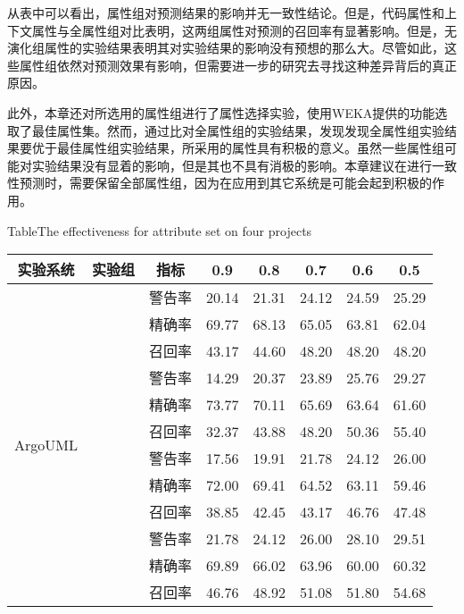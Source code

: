 从表中可以看出，属性组对预测结果的影响并无一致性结论。但是，代码属性和上下文属性与全属性组对比表明，这两组属性对预测的召回率有显著影响。但是，无演化组属性的实验结果表明其对实验结果的影响没有预想的那么大。尽管如此，这些属性组依然对预测效果有影响，但需要进一步的研究去寻找这种差异背后的真正原因。

此外，本章还对所选用的属性组进行了属性选择实验，使用WEKA提供的功能选取了最佳属性集。然而，通过比对全属性组的实验结果，发现发现全属性组实验结果要优于最佳属性组实验结果，所采用的属性具有积极的意义。虽然一些属性组可能对实验结果没有显着的影响，但是其也不具有消极的影响。本章建议在进行一致性预测时，需要保留全部属性组，因为在应用到其它系统是可能会起到积极的作用。

\begin{table} 
\renewcommand\arraystretch{0.65} 
{Table$\!$}{The effectiveness for attribute set on four projects}
\vspace{0.5em}
\centering
\wuhao
\begin{tabular}{cccccccc}
\toprule[1.5pt]
{实验系统}&{实验组}&{指标}&{0.9}&{0.8}&{0.7}&{0.6}&{0.5}\\
\midrule[1pt]
\multirow{12}{*}{ArgoUML}
&~\multirow{3}{*}{全部(\%)}
& 警告率       & 20.14 & 21.31 & 24.12 & 24.59 & 25.29 \\
& & 精确率       & 69.77 & 68.13 & 65.05 & 63.81 & 62.04 \\
& & 召回率       & 43.17 & 44.60 & 48.20 & 48.20 & 48.20 \\
\cline{2-8}
&~\multirow{3}{*}{无Code组    (\%)}
& 警告率       & 14.29 & 20.37 & 23.89 & 25.76 & 29.27 \\
&   & 精确率       & 73.77 & 70.11 & 65.69 & 63.64 & 61.60 \\
 &  & 召回率       & 32.37 & 43.88 & 48.20 & 50.36 & 55.40 \\
 \cline{2-8}
&~\multirow{3}{*}{无Context组   (\%)}
&       警告率       & 17.56 & 19.91 & 21.78 & 24.12 & 26.00 \\
& & 精确率       & 72.00 & 69.41 & 64.52 & 63.11 & 59.46 \\
&             & 召回率       & 38.85 & 42.45 & 43.17 & 46.76 & 47.48 \\
\cline{2-8}
&~\multirow{3}{*}{无Evolution组(\%)}
&    警告率       & 21.78 & 24.12 & 26.00 & 28.10 & 29.51 \\
&  & 精确率       & 69.89 & 66.02 & 63.96 & 60.00 & 60.32 \\
 &             & 召回率       & 46.76 & 48.92 & 51.08 & 51.80 & 54.68 \\

\end{tabular}
\end{table}
